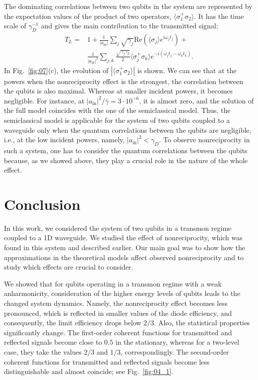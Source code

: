 \documentclass[lettersize,journal]{IEEEtran}
\begin{document}
The dominating correlations between two qubits in the system are represented by the expectation values of the product of two operators, $\langle \sigma_1^+ \sigma_2 \rangle$.
It has the time scale of $\gamma_D^{-1}$ and gives the main contribution to the transmitted signal:
\begin{equation} \label{eq:25}
\begin{aligned}
    T_L =& 1 + \frac{1}{|a_\mathrm{in}|}\sum_j \sqrt{\gamma_j} \mathrm{Re}\left(\langle \sigma_j \rangle e^{i \omega_j t_j}\right) + \\
    &\frac{1}{|a_\mathrm{in}|^2} \sum_{j,k} \frac{\sqrt{\gamma_j \gamma_k}}{2} \langle \sigma_j^+ \sigma_k \rangle e^{-i (\omega_j t_j - \omega_k t_k)}.
\end{aligned}
\end{equation}
In Fig.~\ref{fig:07}(c), the evolution of $|\langle \sigma_1^+ \sigma_2\rangle |$ is shown.
We can see that at the powers when the nonreciprocity effect is the strongest, the correlation between the qubits is also maximal.
Whereas at smaller incident powers, it becomes negligible.
For instance, at $|a_\mathrm{in}|^2 / \bar{\gamma} = 3\cdot 10^{-6}$, it is almost zero, and the solution of the full model coincides with the one of the semiclassical model.
Thus, the semiclassical model is applicable for the system of two qubits coupled to a waveguide only when the quantum correlations between the qubits are negligible, i.e., at the low incident powers, namely, $|a_\mathrm{in}|^2 < \gamma_D$.
To observe nonreciprocity in such a system, one has to consider the quantum correlations between the qubits because, as we showed above, they play a crucial role in the nature of the whole effect.

\section{Conclusion}

In this work, we considered the system of two qubits in a transmon regime coupled to a 1D waveguide.
We studied the effect of nonreciprocity, which was found in this system and described earlier.
Our main goal was to show how the approximations in the theoretical models affect observed nonreciprocity and to study which effects are crucial to consider.

We showed that for qubits operating in a transmon regime with a weak anharmonicity, consideration of the higher energy levels of qubits leads to the changed system dynamics.
Namely, the nonreciprocity effect becomes less pronounced, which is reflected in smaller values of the diode efficiency, and consequently, the limit efficiency drops below $2/3$.
Also, the statistical properties significantly change.
The first-order coherent functions for transmitted and reflected signals become close to $0.5$ in the stationary, whereas for a two-level case, they take the values $2/3$ and $1/3$, correspondingly.
The second-order coherent functions for transmitted and reflected signals become less distinguishable and almost coincide; see Fig.~\ref{fig:04_1}.
\end{document}
